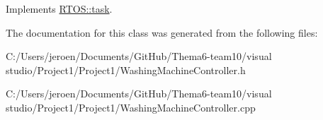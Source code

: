 Implements \hyperlink{class_r_t_o_s_1_1task_addc6d52f8792ddba1158d7ae5ef0037d}{R\+T\+O\+S\+::task}.



The documentation for this class was generated from the following files\+:\begin{DoxyCompactItemize}
\item 
C\+:/\+Users/jeroen/\+Documents/\+Git\+Hub/\+Thema6-\/team10/visual studio/\+Project1/\+Project1/Washing\+Machine\+Controller.\+h\item 
C\+:/\+Users/jeroen/\+Documents/\+Git\+Hub/\+Thema6-\/team10/visual studio/\+Project1/\+Project1/Washing\+Machine\+Controller.\+cpp\end{DoxyCompactItemize}
